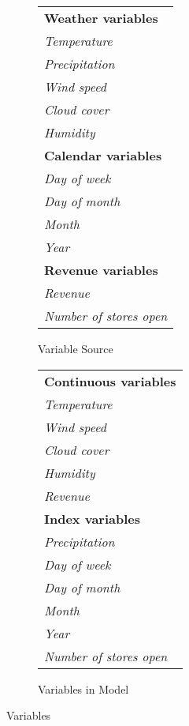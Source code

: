 \begin{figure}[h!]
    \begin{subfigure}{0.5\textwidth}
      \centering
      \caption{Variable Source}
      \label{fig:vars1}
      \begin{tabular}{l}
          \hline 
          \textbf{Weather variables} \\
          \quad\textit{Temperature} \\
          \quad\textit{Precipitation} \\
          \quad\textit{Wind speed} \\
          \quad\textit{Cloud cover} \\
          \quad\textit{Humidity} \\[0.3em]
          \textbf{Calendar variables} \\
          \quad\textit{Day of week} \\
          \quad\textit{Day of month} \\
          \quad\textit{Month} \\
          \quad\textit{Year} \\[0.3em]
          \textbf{Revenue variables} \\
          \quad\textit{Revenue} \\
          \quad\textit{Number of stores open} \\[0.3em]
          \hline
      \end{tabular}
    \end{subfigure}%
    \begin{subfigure}{0.5\textwidth}
      \centering
      \caption{Variables in Model}
      \label{fig:vars2}
      \begin{tabular}{l}
          \hline 
          \textbf{Continuous variables} \\
          \quad\textit{Temperature} \\
          \quad\textit{Wind speed} \\
          \quad\textit{Cloud cover} \\
          \quad\textit{Humidity} \\
          \quad\textit{Revenue} \\[0.3em]
          \textbf{Index variables} \\
          \quad\textit{Precipitation} \\
          \quad\textit{Day of week} \\
          \quad\textit{Day of month} \\
          \quad\textit{Month} \\
          \quad\textit{Year} \\
          \quad\textit{Number of stores open} \\[0.3em]
          \hline
      \end{tabular}
    \end{subfigure}%
    \caption{Variables}
    \label{fig:variables}
\end{figure}

